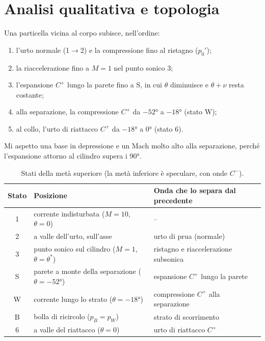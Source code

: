 \documentclass[11pt,a4paper]{article}
\newcommand{\Cp}{C^{+}}
\newcommand{\Cm}{C^{-}}
\begin{document}
\section{Analisi qualitativa e topologia}
Una particella vicina al corpo subisce, nell'ordine:
\begin{enumerate}
\item l'urto normale (1$\to$2) e la compressione fino al ristagno ($p_0'$);
\item la riaccelerazione fino a $M=1$ nel punto sonico 3;
\item l'espansione $\Cp$ lungo la parete fino a S, in cui $\theta$ diminuisce e $\theta+\nu$ resta costante;
\item alla separazione, la compressione $\Cp$ da $-\ang{52}$ a $-\ang{18}$ (stato W);
\item al collo, l'urto di riattacco $\Cp$ da $-\ang{18}$ a \ang{0} (stato 6).
\end{enumerate}
Mi aspetto una base in depressione e un Mach molto alto alla separazione, perché l'espansione attorno al cilindro supera i \ang{90}.

\begin{table}[H]
  \centering
  \small
  \begin{tabular}{cp{6.3cm}p{6.3cm}}
    \toprule
    Stato & Posizione & Onda che lo separa dal precedente \\
    \midrule
    1 & corrente indisturbata ($M=10$, $\theta=0$) & -- \\
    2 & a valle dell'urto, sull'asse & urto di prua (normale) \\
    3 & punto sonico sul cilindro ($M=1$, $\theta=\theta^*$) & ristagno e riaccelerazione subsonica \\
    S & parete a monte della separazione ($\theta=-\ang{52}$) & espansione $\Cp$ lungo la parete \\
    W & corrente lungo lo strato ($\theta=-\ang{18}$) & compressione $\Cp$ alla separazione \\
    B & bolla di ricircolo ($p_B=p_W$) & strato di scorrimento \\
    6 & a valle del riattacco ($\theta=0$) & urto di riattacco $\Cp$ \\
    \bottomrule
  \end{tabular}
  \caption{Stati della metà superiore (la metà inferiore è speculare, con onde $\Cm$).}
\end{table}
\end{document}
